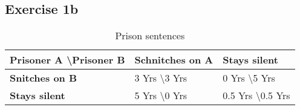 \documentclass[12pt,a4paper]{scrartcl}
\begin{document}
\subsection*{Exercise 1b}
\begin{table}[h]
	\centering
	\label{my-label}
	\begin{tabular}{|l|l|l|}
		\hline
		\textbf{Prisoner A \textbackslash Prisoner B} & \textbf{Schnitches on A}   & \textbf{Stays silent}          \\ \hline
		\textbf{Snitches on B}                        & 3 Yrs \textbackslash 3 Yrs & 0 Yrs \textbackslash 5 Yrs     \\ \hline
		\textbf{Stays silent}                         & 5 Yrs \textbackslash 0 Yrs & 0.5 Yrs \textbackslash 0.5 Yrs \\ \hline
	\end{tabular}
	\caption{Prison sentences}
\end{table}
\end{document}
